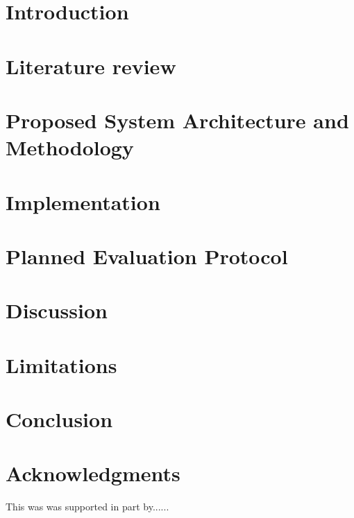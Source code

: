 \documentclass{article}
\begin{document}
\section{Introduction}





\section{Literature review}
\label{sec:litreview}



\section{Proposed System Architecture and Methodology}
\label{sec:proposed_system}





\section{Implementation}
\label{sec:implementation}




\section{Planned Evaluation Protocol}
\label{sec:protocol}




\section{Discussion}
\label{sec:discussion}




\section{Limitations}
\label{sec:limitations}




\section{Conclusion}
\label{sec:conclusion}




\section*{Acknowledgments}
This was was supported in part by......



\end{document}
